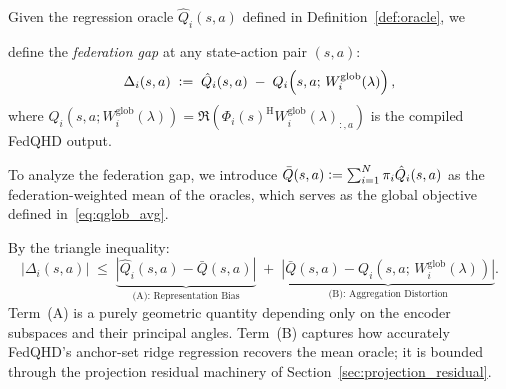 \begin{definition}
Given the regression oracle  $\hat{Q}_i(s,a)$ defined in Definition~\ref{def:oracle}, we 

define the \emph{federation gap} at any state-action pair $(s,a)$:
\begin{equation}
    \Delta_i(s,a)
    \;\vcentcolon=\;
    \hat{Q}_i(s,a)
    \;-\;
    Q_i\!\left(s,a;\,W^{\mathrm{glob}}_i(\lambda)\right),
    \label{eq:gap_def}
\end{equation}
where $Q_i(s,a;W^{\mathrm{glob}}_i(\lambda))
= \Re(\Phi_i(s)^{\mathrm{H}}W^{\mathrm{glob}}_i(\lambda)_{:,a})$
is the compiled FedQHD output.




To analyze the federation gap, we introduce $\bar{Q}(s,a) \vcentcolon= \sum_{i=1}^N \pi_i\hat{Q}_i(s,a)$
as the federation-weighted mean of the oracles, which serves as the global objective defined in~\ref{eq:qglob_avg}.


By the triangle inequality:
\begin{equation}
    |\Delta_i(s,a)|
    \;\leq\;
    \underbrace{|\hat{Q}_i(s,a) - \bar{Q}(s,a)|}_{
    \text{(A): Representation Bias}}
    \;+\;
    \underbrace{|\bar{Q}(s,a)
    - Q_i(s,a;\,W^{\mathrm{glob}}_i(\lambda))|}_{
    \text{(B): Aggregation Distortion}}.
    \label{eq:master_decomp}
\end{equation}
Term~(A) is a purely geometric quantity depending only on the
encoder subspaces and their principal angles.
Term~(B) captures how accurately FedQHD's anchor-set ridge
regression recovers the mean oracle; it is bounded through the
projection residual machinery of
Section~\ref{sec:projection_residual}.
\end{definition}

